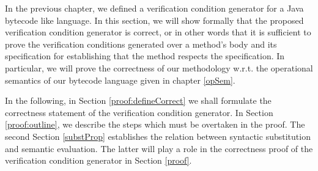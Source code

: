  In the previous chapter, we defined a verification
 condition generator for a Java bytecode like language. In this section, we will show formally that the
 proposed verification condition generator is correct, or in other words that it is sufficient
 to prove the verification conditions generated over a method's body and its specification 
 for establishing that the method respects the specification. 
 In particular, we will prove the correctness of our methodology w.r.t. the operational semantics of our bytecode language
 given in chapter \ref{opSem}. 


 

 In the following, in Section \ref{proof:defineCorrect} we shall formulate the correctness statement of the verification 
 condition generator. In Section \ref{proof:outline}, we describe the steps which must be overtaken in the proof. 
 The second Section \ref{substProp} establishes the relation between syntactic substitution  and semantic evaluation.
 The latter will play a role in the correctness proof  of the verification condition generator
 in Section  \ref{proof}.
  



